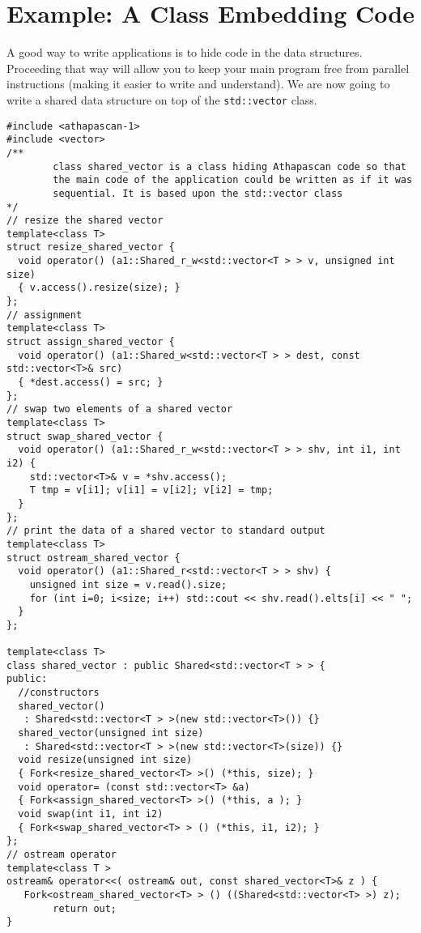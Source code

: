 \section{Example: A Class Embedding \kaapi Code}\label{sec:shd_example}
A good way to write \kaapi  applications is to hide \kaapi  code in the data structures. 
Proceeding that way will allow you to keep your main program free from parallel instructions 
(making it easier to write and understand).  
We are now going to write a shared  data structure on top of the \verb+std::vector+ class. 
\\
\begin{boxit}
\begin{verbatim}
#include <athapascan-1>
#include <vector>
/**
        class shared_vector is a class hiding Athapascan code so that
        the main code of the application could be written as if it was
        sequential. It is based upon the std::vector class
*/
// resize the shared vector
template<class T>
struct resize_shared_vector {
  void operator() (a1::Shared_r_w<std::vector<T > > v, unsigned int size) 
  { v.access().resize(size); }
};
// assignment 
template<class T>
struct assign_shared_vector {
  void operator() (a1::Shared_w<std::vector<T > > dest, const std::vector<T>& src) 
  { *dest.access() = src; }
};
// swap two elements of a shared vector
template<class T>
struct swap_shared_vector {
  void operator() (a1::Shared_r_w<std::vector<T > > shv, int i1, int i2) {
    std::vector<T>& v = *shv.access();
    T tmp = v[i1]; v[i1] = v[i2]; v[i2] = tmp;
  }
};
// print the data of a shared vector to standard output
template<class T>
struct ostream_shared_vector {
  void operator() (a1::Shared_r<std::vector<T > > shv) {
    unsigned int size = v.read().size;
    for (int i=0; i<size; i++) std::cout << shv.read().elts[i] << " ";
  }
};

template<class T>
class shared_vector : public Shared<std::vector<T > > {
public:
  //constructors
  shared_vector() 
   : Shared<std::vector<T > >(new std::vector<T>()) {}
  shared_vector(unsigned int size) 
   : Shared<std::vector<T > >(new std::vector<T>(size)) {}
  void resize(unsigned int size) 
  { Fork<resize_shared_vector<T> >() (*this, size); }
  void operator= (const std::vector<T> &a) 
  { Fork<assign_shared_vector<T> >() (*this, a ); }       
  void swap(int i1, int i2) 
  { Fork<swap_shared_vector<T> > () (*this, i1, i2); }
};
// ostream operator
template<class T >
ostream& operator<<( ostream& out, const shared_vector<T>& z ) {
   Fork<ostream_shared_vector<T> > () ((Shared<std::vector<T> >) z);
        return out;
}
\end{verbatim}
\end{boxit}

